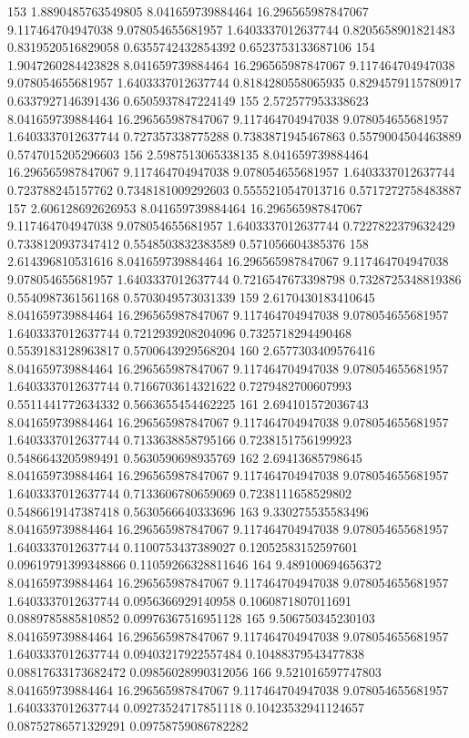 {153 1.8890485763549805 8.041659739884464 16.296565987847067 9.117464704947038 9.078054655681957 1.6403337012637744 0.8205658901821483 0.8319520516829058 0.6355742432854392 0.6523753133687106
154 1.9047260284423828 8.041659739884464 16.296565987847067 9.117464704947038 9.078054655681957 1.6403337012637744 0.8184280558065935 0.8294579115780917 0.6337927146391436 0.6505937847224149
155 2.572577953338623 8.041659739884464 16.296565987847067 9.117464704947038 9.078054655681957 1.6403337012637744 0.727357338775288 0.7383871945467863 0.5579004504463889 0.5747015205296603
156 2.5987513065338135 8.041659739884464 16.296565987847067 9.117464704947038 9.078054655681957 1.6403337012637744 0.723788245157762 0.7348181009292603 0.5555210547013716 0.5717272758483887
157 2.606128692626953 8.041659739884464 16.296565987847067 9.117464704947038 9.078054655681957 1.6403337012637744 0.7227822379632429 0.7338120937347412 0.5548503832383589 0.571056604385376
158 2.614396810531616 8.041659739884464 16.296565987847067 9.117464704947038 9.078054655681957 1.6403337012637744 0.7216547673398798 0.7328725348819386 0.5540987361561168 0.5703049573031339
159 2.6170430183410645 8.041659739884464 16.296565987847067 9.117464704947038 9.078054655681957 1.6403337012637744 0.7212939208204096 0.7325718294490468 0.5539183128963817 0.5700643929568204
160 2.6577303409576416 8.041659739884464 16.296565987847067 9.117464704947038 9.078054655681957 1.6403337012637744 0.7166703614321622 0.7279482700607993 0.5511441772634332 0.5663655454462225
161 2.694101572036743 8.041659739884464 16.296565987847067 9.117464704947038 9.078054655681957 1.6403337012637744 0.7133638858795166 0.7238151756199923 0.5486643205989491 0.5630590698935769
162 2.69413685798645 8.041659739884464 16.296565987847067 9.117464704947038 9.078054655681957 1.6403337012637744 0.7133606780659069 0.7238111658529802 0.5486619147387418 0.5630566640333696
163 9.330275535583496 8.041659739884464 16.296565987847067 9.117464704947038 9.078054655681957 1.6403337012637744 0.1100753437389027 0.12052583152597601 0.09619791399348866 0.11059266328811646
164 9.489100694656372 8.041659739884464 16.296565987847067 9.117464704947038 9.078054655681957 1.6403337012637744 0.0956366929140958 0.1060871807011691 0.0889785885810852 0.09976367516951128
165 9.506750345230103 8.041659739884464 16.296565987847067 9.117464704947038 9.078054655681957 1.6403337012637744 0.09403217922557484 0.10488379543477838 0.08817633173682472 0.09856028990312056
166 9.521016597747803 8.041659739884464 16.296565987847067 9.117464704947038 9.078054655681957 1.6403337012637744 0.09273524717851118 0.10423532941124657 0.08752786571329291 0.09758759086782282
}
